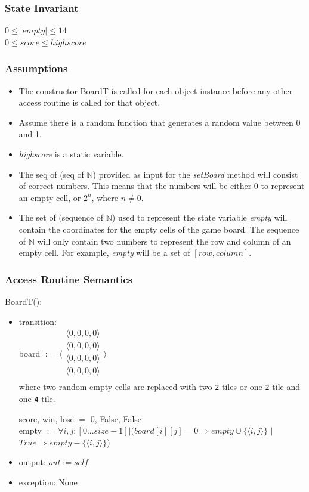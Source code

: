 \documentclass[12pt]{article}
\begin{document}
\subsubsection* {State Invariant}

$0 \le |empty| \le 14$\\
$0 \le score \le highscore$

\subsubsection* {Assumptions}

\begin{itemize}
  \item The constructor BoardT is called for each object instance before any other access routine 
  is called for that object. 
  \item Assume there is a random function that generates a random value between 0 and 1.
  \item \textit{highscore} is a static variable.
  \item The seq of (seq of $\mathbb{N}$) provided as input for the \textit{setBoard} method will consist of correct numbers. This means that the numbers will be either $0$ to represent an empty cell, or $2^n$, where $n \ne 0$.
  \item The set of (sequence of $\mathbb{N}$) used to represent the state variable \textit{empty} will contain the coordinates for the empty cells of the game board. The sequence of $\mathbb{N}$ will only contain two numbers to represent the row and column of an empty cell. For example, \textit{empty} will be a set of $[row, column]$.
\end{itemize}

\subsubsection* {Access Routine Semantics}

BoardT():
\begin{itemize}
\item transition: \\
      board $:=$ 
      $\langle \begin{array}{c}
      \langle 0, 0, 0, 0 \rangle\\
      \langle 0, 0, 0, 0 \rangle\\
      \langle 0, 0, 0, 0 \rangle\\
      \langle 0, 0, 0, 0 \rangle\\
      \end{array} \rangle$ \\ 
      where two random empty cells are replaced with two \texttt{2} tiles or one \texttt{2} tile and one \texttt{4} tile.

      score, win, lose $=$ 0, False, False\\
      empty $:= \forall i, j : [0...size-1] | (board[i][j] = 0 \Rightarrow empty \cup \{\langle i, j \rangle\}$ $|$ $True \Rightarrow empty - \{\langle i, j \rangle\}$)
\item output: $out := \mathit{self}$
\item exception: None
\end{itemize}
\end{document}
